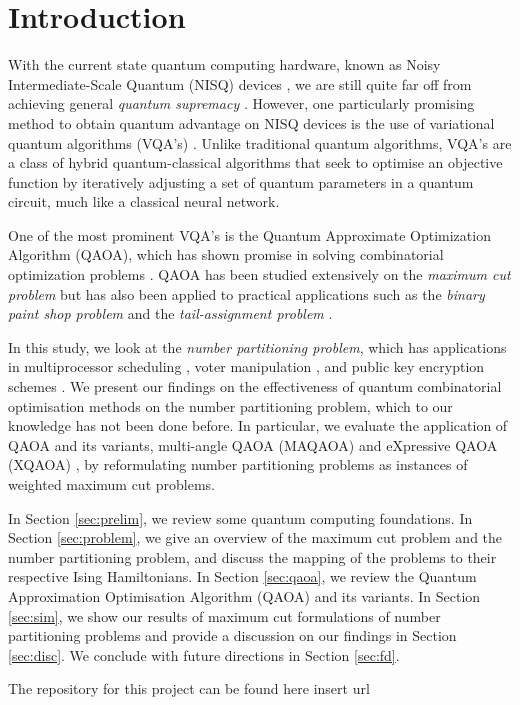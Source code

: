 \section{Introduction}

With the current state quantum computing hardware, known as Noisy Intermediate-Scale Quantum (NISQ) devices \cite{Preskill2018quantumcomputingin}, we are still quite far off from achieving general \emph{quantum supremacy} \cite{boixo2018characterizing}. However, one particularly promising method to obtain quantum advantage on NISQ devices is the use of variational quantum algorithms (VQA's) \cite{cerezo2021variational}. Unlike traditional quantum algorithms, VQA's are a class of hybrid quantum-classical algorithms that seek to optimise an objective function by iteratively adjusting a set of quantum parameters in a quantum circuit, much like a classical neural network.

One of the most prominent VQA's is the Quantum Approximate Optimization Algorithm (QAOA), which has shown promise in solving combinatorial optimization problems \cite{farhi2014quantum}. QAOA has been studied extensively on the \emph{maximum cut problem} but has also been applied to practical applications such as the \emph{binary paint shop problem} \cite{streif2021beating} and the \emph{tail-assignment problem} \cite{vikstaal2020applying}.

In this study, we look at the \emph{number partitioning problem}, which has applications in multiprocessor scheduling \cite{sarkar1987partitioning}, voter manipulation \cite{walsh2009really}, and public key encryption schemes \cite{merkle1978hiding}. We present our findings on the effectiveness of quantum combinatorial optimisation methods on the number partitioning problem, which to our knowledge has not been done before. In particular, we evaluate the application of QAOA and its variants, multi-angle QAOA (MAQAOA) \cite{herrman2022multi} and eXpressive QAOA (XQAOA) \cite{vijendran2023expressive}, by reformulating number partitioning problems as instances of weighted maximum cut problems. 

In Section \ref{sec:prelim}, we review some quantum computing foundations. In Section \ref{sec:problem}, we give an overview of the maximum cut problem and the number partitioning problem, and discuss the mapping of the problems to their respective Ising Hamiltonians. In Section \ref{sec:qaoa}, we review the Quantum Approximation Optimisation Algorithm (QAOA) and its variants. In Section \ref{sec:sim}, we show our results of maximum cut formulations of number partitioning problems and provide a discussion on our findings in Section \ref{sec:disc}. We conclude with future directions in Section \ref{sec:fd}.

The repository for this project can be found here {\color{red} insert url}

